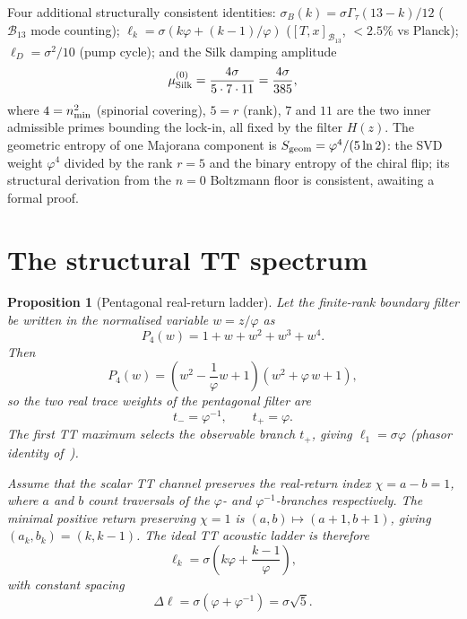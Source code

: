 \documentclass[twocolumn,10pt]{article}
\newcommand{\vp}{\varphi}
\newcommand{\Gt}{\Gamma_\tau}
\newcommand{\Bone}{\mathcal{B}_{13}}
\newcommand{\Sgeom}{S_{\rm geom}}
\newcommand{\mustr}{\mu_{\rm Silk}^{(0)}}
\newcommand{\lD}{\ell_D}
\newtheorem{proposition}[theorem]{Proposition}
\begin{document}
Four additional structurally consistent identities: $\sigma_B(k)=\sigma\Gt
(13-k)/12$ ($\Bone$ mode counting); $\ell_k=\sigma(k\vp+(k-1)/\vp)$
($[T,x]_{\Bone}$, $<2.5\%$ vs Planck); $\lD=\sigma^2/10$ (pump
cycle); and the Silk damping amplitude
\[
\mustr=\frac{4\sigma}{5\cdot7\cdot11}=\frac{4\sigma}{385},
\]
where $4=n_{\rm min}^2$ (spinorial covering), $5=r$ (rank),
$7$ and $11$ are the two inner admissible primes bounding the
lock-in, all fixed by the filter $H(z)$.
The geometric entropy of one Majorana component is
$\Sgeom=\vp^4/(5\ln 2)$: the SVD weight $\vp^4$ divided by the rank
$r=5$ and the binary entropy of the chiral flip; its structural
derivation from the $n=0$ Boltzmann floor is consistent, awaiting a
formal proof.

\section{The structural TT spectrum}
\label{sec:TT}

\begin{proposition}[Pentagonal real-return ladder]
\label{prop:ladder}
Let the finite-rank boundary filter be written in the normalised
variable $w=z/\vp$ as
\begin{equation}
  P_4(w) = 1+w+w^2+w^3+w^4.
  \label{eq:P4_norm}
\end{equation}
Then
\begin{equation}
  P_4(w)
  =
  \!\left(w^2-\frac{1}{\vp}w+1\right)\!\left(w^2+\vp\,w+1\right),
  \label{eq:P4_factor}
\end{equation}
so the two real trace weights of the pentagonal filter are
\begin{equation}
  t_- = \vp^{-1}, \qquad t_+ = \vp.
\end{equation}
The first TT maximum selects the observable branch $t_+$, giving
$\ell_1=\sigma\vp$ (phasor identity of~\cite{CamKer163}).

Assume that the scalar TT channel preserves the real-return index
$\chi=a-b=1$, where $a$ and $b$ count traversals of the $\vp$- and
$\vp^{-1}$-branches respectively. The minimal positive return preserving
$\chi=1$ is $(a,b)\mapsto(a+1,b+1)$, giving $(a_k,b_k)=(k,k-1)$.
The ideal TT acoustic ladder is therefore
\begin{equation}
  \ell_k = \sigma\!\left(k\vp+\frac{k-1}{\vp}\right),
  \label{eq:ladder}
\end{equation}
with constant spacing
\begin{equation}
  \Delta\ell = \sigma\!\left(\vp+\vp^{-1}\right) = \sigma\sqrt{5}.
  \label{eq:Delta_ell}
\end{equation}
\end{proposition}
\end{document}
